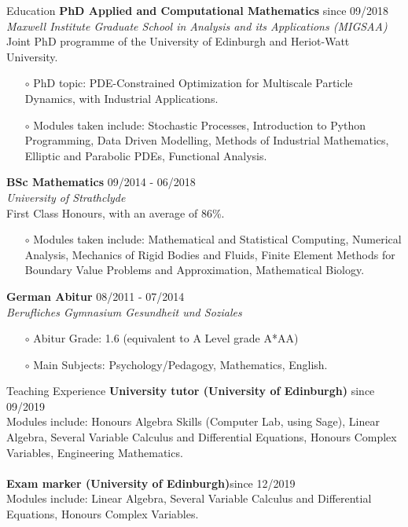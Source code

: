 \documentclass{resume} %
\begin{document}
	
\begin{rSection}{Education}
	{\bf PhD Applied and Computational Mathematics} \hfill{since 09/2018}\\
	{\it Maxwell Institute Graduate School in Analysis and its Applications (MIGSAA)}\\
	Joint PhD programme of the University of Edinburgh and Heriot-Watt University.
	\begin{itemize}
		\item[$\circ$] PhD topic: PDE-Constrained Optimization for Multiscale Particle Dynamics, with Industrial Applications.
		\item[$\circ$]	Modules taken include: Stochastic Processes, Introduction to Python Programming, Data Driven Modelling, Methods of Industrial Mathematics, Elliptic and Parabolic PDEs, Functional Analysis.
	\end{itemize}

	
{\bf BSc Mathematics} \hfill{09/2014 - 06/2018}	\\
{\it University of Strathclyde}\\	
	First Class Honours, with an average of 86\%. 
	\begin{itemize}
		\item[$\circ$] Modules taken include: Mathematical and Statistical Computing, Numerical Analysis, Mechanics of Rigid Bodies and Fluids, Finite Element Methods for Boundary Value Problems and Approximation, Mathematical Biology.
	\end{itemize}	

{\bf German Abitur} \hfill{08/2011 - 07/2014}\\
{\it Berufliches Gymnasium Gesundheit und Soziales}	
\begin{itemize}
	\item[$\circ$] Abitur Grade: 1.6 (equivalent to A Level grade A*AA)
	\item[$\circ$] Main Subjects: Psychology/Pedagogy, Mathematics, English.
\end{itemize}	
\vspace{0.4 cm}
\end{rSection}	
\begin{rSection}{Teaching Experience}
	{\bf University tutor (University of Edinburgh)} \hfill{since 09/2019}\\
	Modules include: Honours Algebra Skills (Computer Lab, using Sage), Linear Algebra, Several Variable Calculus and Differential Equations, Honours Complex Variables, Engineering Mathematics.\\
	\\
	{\bf Exam marker (University of Edinburgh)}\hfill{since 12/2019}\\
	Modules include: Linear Algebra, Several Variable Calculus and Differential Equations, Honours Complex Variables.
\end{rSection}
\end{document}
